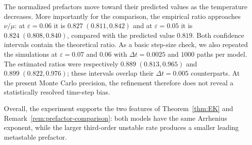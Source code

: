 \documentclass[11pt]{article}
\numberwithin{equation}{section}
\theoremstyle{plain}
\theoremstyle{definition}
\theoremstyle{remark}
\newcommand{\eps}{\varepsilon}
\begin{document}
The normalized prefactors move toward their predicted values as the
temperature decreases.  More importantly for the comparison, the empirical
ratio approaches $\nu/\mu$: at $\eps=0.06$ it is $0.827\;(0.811,0.842)$ and
at $\eps=0.05$ it is $0.824\;(0.808,0.840)$, compared with the predicted value
$0.819$.  Both confidence intervals contain the theoretical ratio.  As a basic
step-size check, we also repeated the simulations at $\eps=0.07$ and $0.06$
with $\Delta t=0.0025$ and $1000$ paths per model.  The estimated ratios were
respectively $0.889\;(0.813,0.965)$ and $0.899\;(0.822,0.976)$; these intervals
overlap their $\Delta t=0.005$ counterparts.  At the present Monte Carlo
precision, the refinement therefore does not reveal a statistically resolved
time-step bias.

Overall, the experiment supports the two features of
Theorem~\ref{thm:EK} and Remark~\ref{rem:prefactor-comparison}: both models
have the same Arrhenius exponent, while the larger third-order unstable rate
produces a smaller leading metastable prefactor.

\clearpage


\end{document}
